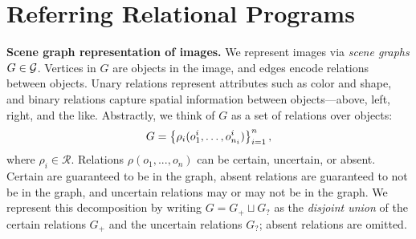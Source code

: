 \section{Referring Relational Programs}

\textbf{Scene graph representation of images.}
%
We represent images via \emph{scene graphs} $G \in \mathcal{G}$. Vertices in $G$ are objects in the image, and edges encode relations between objects. Unary relations represent attributes such as color and shape, and binary relations capture spatial information between objects---above, left, right, and the like. Abstractly, we think of $G$ as a set of relations over objects:
\begin{align*}
G=\left\{ \rho_i(o^i_1, \dots, o^i_{n_i}) \right\}_{i=1}^n,
\end{align*}
where $\rho_i\in\mathcal{R}$. Relations $\rho(o_1,...,o_n)$ can be certain, uncertain, or absent. Certain are guaranteed to be in the graph, absent relations are guaranteed to not be in the graph, and uncertain relations may or may not be in the graph. We represent this decomposition by writing $G = G_+ \sqcup G_?$ as the \emph{disjoint union} of the certain relations $G_+$ and the uncertain relations $G_?$; absent relations are omitted.

